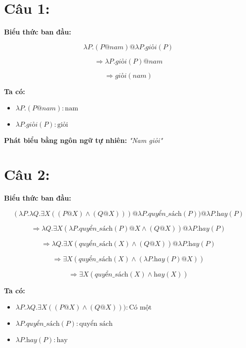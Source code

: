 \documentclass[a4paper, 15pt]{article}
\begin{document}
\section*{Câu 1:}

\textbf{Biểu thức ban đầu:}

\[
\lambda P.(P @ \textit{nam}) @ \lambda P. \textit{giỏi}(P)
\]

\[
\Rightarrow \lambda P. \textit{giỏi}(P) @ \textit{nam}
\]

\[
\Rightarrow \textit{giỏi}(\textit{nam})
\]

\textbf{Ta có:}

\begin{itemize}
    \item $\lambda P. (P @ \textit{nam}) : \text{nam}$
    \item $\lambda P. \textit{giỏi} (P) : \text{giỏi}$
\end{itemize}

\textbf{Phát biểu bằng ngôn ngữ tự nhiên: }
\textit{"Nam giỏi"}

\vspace{10pt}

\section*{Câu 2:}

\textbf{Biểu thức ban đầu:}

\begin{flushleft}
\[
(\lambda P. \lambda Q. \exists X ((P@X) \land (Q@X))) @ \lambda P. \textit{quyển\_sách}(P)) @ \lambda P. \textit{hay}(P)
\]

\[
\Rightarrow \lambda Q. \exists X (\lambda P. \textit{quyển\_sách}(P) @ X \land (Q@X)) @ \lambda P. \textit{hay}(P)
\]

\[
\Rightarrow \lambda Q. \exists X (\textit{quyển\_sách}(X) \land (Q@X)) @ \lambda P. \textit{hay}(P)
\]

\[
\Rightarrow \exists X (\textit{quyển\_sách}(X) \land (\lambda P. \textit{hay}(P) @ X))
\]

\[
\Rightarrow \exists X (\textit{quyển\_sách}(X) \land \textit{hay}(X))
\]
\end{flushleft}

\textbf{Ta có:}

\begin{itemize}
    \item $\lambda P. \lambda Q. \exists X ((P@X) \land (Q@X))) : \text{Có một}$
    \item $\lambda P. \textit{quyển\_sách}(P) : \text{quyển sách}$
    \item $\lambda P. \textit{hay}(P) : \text{hay}$
\end{itemize}
\end{document}
